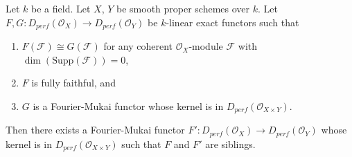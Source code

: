\begin{lemma}
\label{lemma-two-functors}
Let $k$ be a field. Let $X$, $Y$ be smooth proper schemes over $k$.
Let $F, G : D_{perf}(\mathcal{O}_X) \to D_{perf}(\mathcal{O}_Y)$
be $k$-linear exact functors such that
\begin{enumerate}
\item $F(\mathcal{F}) \cong G(\mathcal{F})$ for any coherent
$\mathcal{O}_X$-module $\mathcal{F}$ with $\dim(\text{Supp}(\mathcal{F})) = 0$,
\item $F$ is fully faithful, and
\item $G$ is a Fourier-Mukai functor whose kernel is in
$D_{perf}(\mathcal{O}_{X \times Y})$.
\end{enumerate}
Then there exists a Fourier-Mukai functor
$F' : D_{perf}(\mathcal{O}_X) \to D_{perf}(\mathcal{O}_Y)$
whose kernel is in $D_{perf}(\mathcal{O}_{X \times Y})$
such that $F$ and $F'$ are siblings.
\end{lemma}


